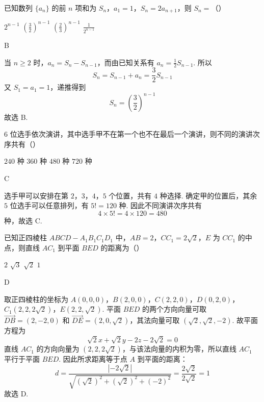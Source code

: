 \begin{problem}
已知数列 \(\{a_{n}\}\) 的前 \(n\) 项和为 \(S_{n}\)，\(a_{1} = 1\)，\(S_{n} = 2a_{n+1}\)，则 \(S_{n} =\)（\quad）

\choices
    {\(2^{n - 1}\)}
    {\(\left(\frac{3}{2}\right)^{n - 1}\)}
    {\(\left(\frac{2}{3}\right)^{n - 1}\)}
    {\(\frac{1}{2^{n - 1}}\)}
\end{problem}

\begin{answer}
B
\end{answer}

\begin{solution}
当 \(n\geqslant2\) 时，\(a_n=S_n-S_{n-1}\)，而由已知关系有 \(a_n=\frac12S_{n-1}\). 所以
\[
S_n=S_{n-1}+a_n=\frac32S_{n-1}
\]
又 \(S_1=a_1=1\)，递推得到
\[
S_n=\left(\frac32\right)^{n-1}
\]
故选 B.
\end{solution}

\begin{problem}
\(6\) 位选手依次演讲，其中选手甲不在第一个也不在最后一个演讲，则不同的演讲次序共有（\quad）

\choices
    {\(240\) 种}
    {\(360\) 种}
    {\(480\) 种}
    {\(720\) 种}
\end{problem}

\begin{answer}
C
\end{answer}

\begin{solution}
选手甲可以安排在第 \(2\)，\(3\)，\(4\)，\(5\) 个位置，共有 \(4\) 种选择. 确定甲的位置后，其余 \(5\) 位选手可以任意排列，有 \(5!=120\) 种. 因此不同演讲次序共有
\[
4\times5!=4\times120=480
\]
种，故选 C.
\end{solution}

\begin{problem}
已知正四棱柱 \(ABCD - A_{1}B_{1}C_{1}D_{1}\) 中，\(AB = 2\)，\(CC_{1} = 2\sqrt{2}\)，\(E\) 为 \(CC_{1}\) 的中点，则直线 \(AC_{1}\) 到平面 \(BED\) 的距离为（\quad）

\choices
    {\(2\)}
    {\(\sqrt{3}\)}
    {\(\sqrt{2}\)}
    {\(1\)}
\end{problem}

\begin{answer}
D
\end{answer}

\begin{solution}
取正四棱柱的坐标为 \(A(0,0,0)\)，\(B(2,0,0)\)，\(C(2,2,0)\)，\(D(0,2,0)\)，
\(C_1(2,2,2\sqrt2)\)，\(E(2,2,\sqrt2)\).
平面 \(BED\) 的两个方向向量可取 \(\overrightarrow{DB}=(2,-2,0)\) 和 \(\overrightarrow{DE}=(2,0,\sqrt2)\)，其法向量可取 \((\sqrt2,\sqrt2,-2)\). 故平面方程为
\[
\sqrt2x+\sqrt2y-2z-2\sqrt2=0
\]
直线 \(AC_1\) 的方向向量为 \((2,2,2\sqrt2)\)，与该法向量的内积为零，所以直线 \(AC_1\) 平行于平面 \(BED\). 因此所求距离等于点 \(A\) 到平面的距离：
\[
d=\frac{|-2\sqrt2|}{\sqrt{(\sqrt2)^2+(\sqrt2)^2+(-2)^2}}=\frac{2\sqrt2}{2\sqrt2}=1
\]
故选 D.
\end{solution}


